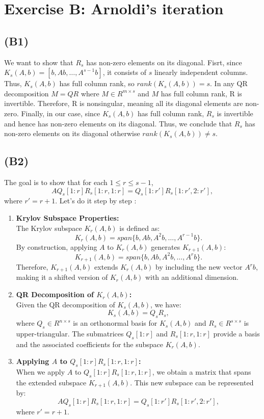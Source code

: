 \documentclass{article}
\begin{document}
\section{Exercise B: Arnoldi’s iteration}
\subsection*{(B1)}
We want to show that $ R_s $ has non-zero elements on its diagonal.
Fisrt, since $ K_s(A, b) = [b, Ab, \dots, A^{s-1}b] $, it consists of $ s $ linearly independent columns. Thus, $ K_s(A, b) $ has full column rank,
 so $ rank(K_s(A, b)) = s $.
In any QR decomposition $ M = QR$ where $ M \in R^{m \times s} $ and $ M $ has full column rank, R is invertible. 
Therefore, R is nonsingular, meaning all its diagonal elements are non-zero.
Finally, in our case, since $ K_s(A, b) $ has full column rank, $R_s $ is invertible and hence has non-zero elements on its diagonal.
Thus, we conclude that $ R_s $ has non-zero elements on its diagonal otherwise $rank(K_s (A,b)) \neq s$.

\subsection*{(B2)}
The goal is to show that for each $ 1 \leq r \leq s - 1 $,
\[
A Q_s[1:r] R_s[1:r, 1:r] = Q_s[1:r'] R_s[1:r', 2:r'],
\]
where $ r' = r + 1 $.
Let's do it step by step : 
\begin{enumerate}
    \item \textbf{Krylov Subspace Properties:} \\
    The Krylov subspace $ K_r(A, b) $ is defined as:
    \[
    K_r(A, b) = span\{b, Ab, A^2b, \dots, A^{r-1}b\}.
    \]
    By construction, applying $ A $ to $ K_r(A, b) $ generates $ K_{r+1}(A, b) $:
    \[
    K_{r+1}(A, b) = span\{b, Ab, A^2b, \dots, A^r b\}.
    \]
    Therefore, $ K_{r+1}(A, b) $ extends $ K_r(A, b) $ by including the new vector $ A^r b $, making it a shifted version of $ K_r(A, b) $ with an additional dimension.

    \item \textbf{QR Decomposition of $ K_r(A, b) $:} \\
    Given the QR decomposition of $ K_s(A, b) $, we have:
    \[
    K_s(A, b) = Q_s R_s,
    \]
    where $ Q_s \in R^{n \times s} $ is an orthonormal basis for $ K_s(A, b) $ and $ R_s \in R^{s \times s} $ is upper-triangular. The submatrices $ Q_s[1:r] $ and $ R_s[1:r, 1:r] $ provide a basis and the associated coefficients for the subspace $ K_r(A, b) $.

    \item \textbf{Applying $ A $ to $ Q_s[1:r] R_s[1:r, 1:r] $:} \\
    When we apply $ A $ to $ Q_s[1:r] R_s[1:r, 1:r] $, we obtain a matrix that spans the extended subspace $ K_{r+1}(A, b) $. This new subspace can be represented by:
    \[
    A Q_s[1:r] R_s[1:r, 1:r] = Q_s[1:r'] R_s[1:r', 2:r'],
    \]
    where $ r' = r + 1 $. 
\end{enumerate}
\end{document}
